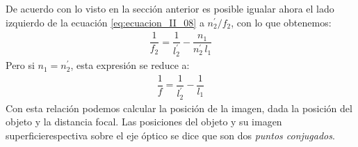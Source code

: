 \documentclass[14pt]{extarticle}
\begin{document}
De acuerdo con lo visto en la sección anterior es posible igualar ahora el lado izquierdo de la ecuación \ref{eq:ecuacion_II_08} a $n_{2}^{\prime}/f_{2}$, con lo que obtenemos:
\begin{align}
\dfrac{1}{f_{2}} = \dfrac{1}{l_{2}^{\prime}} - \dfrac{n_{1}}{n_{2}^{\prime} \, l_{1}}
\label{eq:ecuacion_II_13}
\end{align}
Pero si $n_{1} = n_{2}^{\prime}$, esta expresión se reduce a:
\begin{align}
\dfrac{1}{f} = \dfrac{1}{l_{2}^{\prime}} - \dfrac{1}{l_{1}}
\label{eq:ecuacion_II_14}
\end{align}
Con esta relación podemos calcular la posición de la imagen, dada la posición del objeto y la distancia focal. Las posiciones del objeto y su imagen superficierespectiva sobre el eje óptico se dice que son dos \textit{puntos conjugados}.
\end{document}
